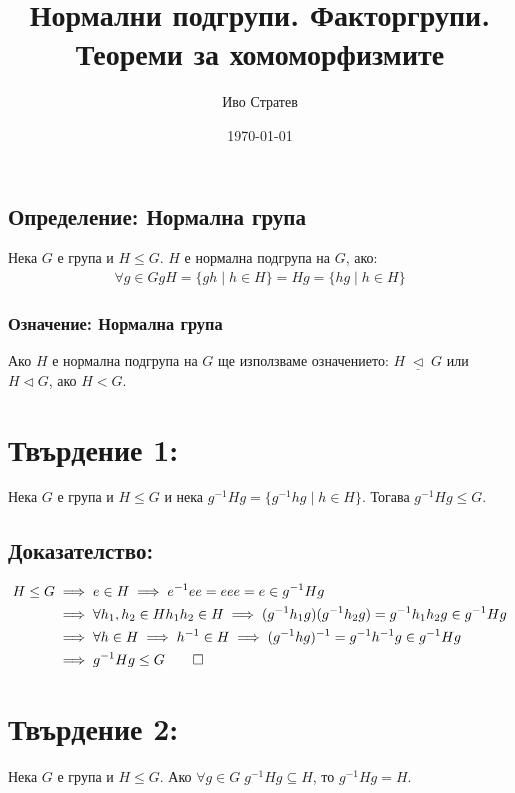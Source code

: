\documentclass{article}
\newcommand{\NSG}{\; \underline{\triangleleft} \;}
\begin{document}
\title{Нормални подгрупи. Факторгрупи. Теореми за хомоморфизмите}
\author{Иво Стратев}
\date{\today}
\maketitle

\subsection*{Определение: Нормална група}
Нека $G$ е група и $H \leq G$. $H$ е нормална подгрупа на $G$, ако:
\begin{align*}
	\forall g \in G gH = \{gh \; | \; h \in H\} = Hg = \{hg \; | \; h \in H\}
\end{align*}

\subsubsection*{Означение: Нормална група}
Ако $H$ е нормална подгрупа на $G$ ще използваме означението: $H \NSG G$ или $H \triangleleft G$, ако $H < G$.

\section*{Твърдение 1:}
Нека $G$ е група и $H \leq G$ и нека $g^{-1}Hg = \{g^{-1}hg \; | \; h \in H\}$. Тогава $g^{-1}Hg \leq G$.

\subsection*{Доказателство:}

\begin{align*}
	H \leq G & \implies e \in H \implies e^{-1}ee = eee = e \in g^{-1}Hg \\
			 & \implies \forall h_1, h_2 \in H h_1h_2 \in H \implies (g^{-1}h_1g)(g^{-1}h_2g) = g^{-1}h_1h_2g \in g^{-1}Hg \\
			 & \implies \forall h \in H \implies h^{-1} \in H \implies (g^{-1}hg)^{-1} = g^{-1}h^{-1}g \in g^{-1}Hg \\
			 & \implies g^{-1}Hg \leq G \qed
\end{align*}

\section*{Твърдение 2:}
Нека $G$ е група и $H \leq G$. Ако $\forall g \in G \; g^{-1}Hg \subseteq H$, то $g^{-1}Hg = H$.
\end{document}
